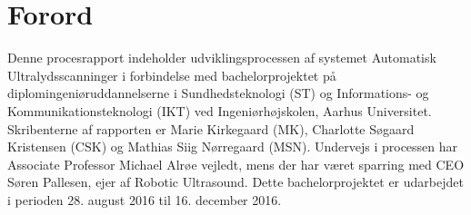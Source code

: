 \chapter{Forord}\label{kapForord}
Denne procesrapport indeholder udviklingsprocessen af systemet Automatisk Ultralydsscanninger i forbindelse med bachelorprojektet på diplomingeniøruddannelserne i Sundhedsteknologi (ST) og Informations- og Kommunikationsteknologi (IKT) ved Ingeniørhøjskolen, Aarhus Universitet. Skribenterne af rapporten er Marie Kirkegaard (MK), Charlotte Søgaard Kristensen (CSK) og Mathias Siig Nørregaard (MSN). Undervejs i processen har Associate Professor Michael Alrøe vejledt, mens der har været sparring med CEO Søren Pallesen, ejer af Robotic Ultrasound. 
Dette bachelorprojektet er udarbejdet i perioden 28. august 2016 til 16. december 2016.